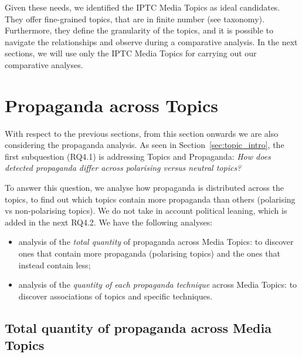 Given these needs, we identified the IPTC Media Topics as ideal candidates.
They offer fine-grained topics, that are in finite number (see taxonomy). Furthermore, they define the granularity of the topics, and it is possible to navigate the relationships and observe during a comparative analysis.
In the next sections, we will use only the IPTC Media Topics for carrying out our comparative analyses.


\section{\statusgreen Propaganda across Topics}
\label{sec:topic_propaganda}

With respect to the previous sections, from this section onwards we are also considering the propaganda analysis.
As seen in Section~\ref{sec:topic_intro}, the first subquestion (RQ4.1) is addressing Topics and Propaganda:
\emph{How does detected propaganda differ across polarising versus neutral topics?}

To answer this question, we analyse how propaganda is distributed across the topics, to find out which topics contain more propaganda than others (polarising vs non-polarising topics).
We do not take in account political leaning, which is added in the next RQ4.2.
We have the following analyses:

\begin{itemize}
    \item analysis of the \emph{total quantity} of propaganda across Media Topics: to discover ones that contain more propaganda (polarising topics) and the ones that instead contain less;
    \item analysis of the \emph{quantity of each propaganda technique} across Media Topics: to discover associations of topics and specific techniques.
\end{itemize}

\subsection{\statusgreen Total quantity of propaganda across Media Topics}
\label{ssec:topic_propaganda_tot}

